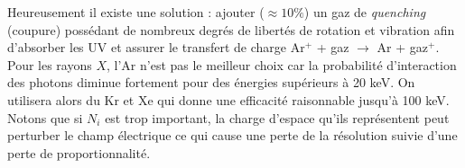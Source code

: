 Heureusement il existe une solution : ajouter ($\approx10\%$) un gaz de \textit{quenching} (coupure)
possédant de nombreux degrés de libertés de rotation et vibration afin d'absorber les UV et 
assurer le transfert de charge Ar$^+$ + gaz $\to$ Ar + gaz$^+$.\\
	
Pour les rayons $X$, l'Ar n'est pas le meilleur choix car la probabilité d'interaction des photons 
diminue fortement pour des énergies supérieurs à 20 keV. On utilisera alors du Kr et Xe qui donne
une efficacité raisonnable jusqu'à 100 keV.\\

Notons que si $N_i$ est trop important, la charge d'espace qu'ils représentent peut perturber le
champ électrique ce qui cause une perte de la résolution suivie d'une perte de 
proportionnalité.



\newpage
